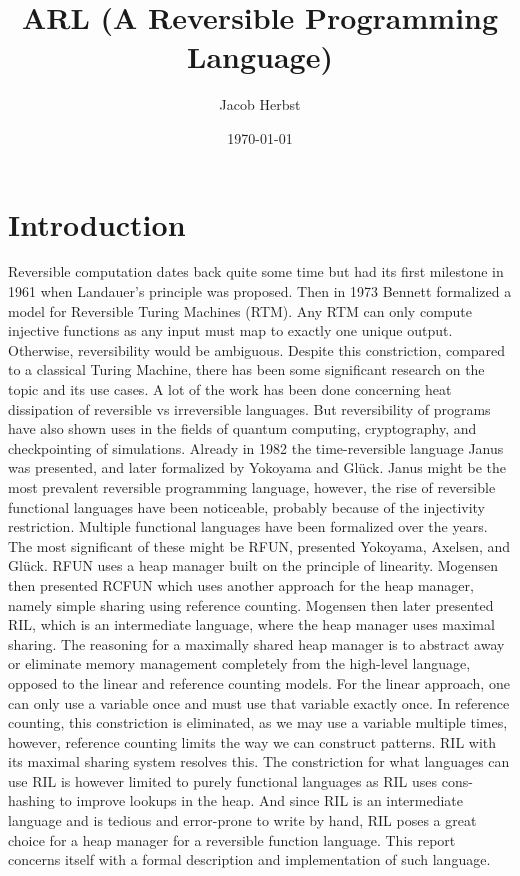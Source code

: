 \documentclass[a4paper]{article}
\author{Jacob Herbst}
\date{\today}
\title{ARL (A Reversible Programming Language)}
\begin{document}
\maketitle

\section{Introduction}
\label{intro}
Reversible computation dates back quite some time but had its first milestone in 1961 when Landauer's principle was proposed\cite{L61}. Then in 1973 Bennett\cite{B73} formalized a model for Reversible Turing Machines (RTM). Any RTM can only compute injective functions as any input must map to exactly one unique output. Otherwise, reversibility would be ambiguous. Despite this constriction, compared to a classical Turing Machine, there has been some significant research on the topic and its use cases. A lot of the work has been done concerning heat dissipation of reversible vs irreversible languages. But reversibility of programs have also shown uses in the fields of quantum computing, cryptography, and checkpointing of simulations\cite{Schordan2020}. Already in 1982 the time-reversible language Janus was presented, and later formalized by Yokoyama and Glück\cite{janus}. Janus might be the most prevalent reversible programming language, however, the rise of reversible functional languages have been noticeable, probably because of the injectivity restriction. Multiple functional languages have been formalized over the years. The most significant of these might be RFUN, presented Yokoyama, Axelsen, and Glück\cite{YokoyamaAxelsenGluck:2011}. RFUN uses a heap manager built on the principle of linearity. Mogensen then presented RCFUN\cite{Mogensen:RC2014} which uses another approach for the heap manager, namely simple sharing using reference counting. Mogensen then later presented RIL, which is an intermediate language, where the heap manager uses maximal sharing\cite{Mogensen2018ReversibleGC}. The reasoning for a maximally shared heap manager is to abstract away or eliminate memory management completely from the high-level language, opposed to the linear and reference counting models. For the linear approach, one can only use a variable once and must use that variable exactly once. In reference counting, this constriction is eliminated, as we may use a variable multiple times, however, reference counting limits the way we can construct patterns. RIL with its maximal sharing system resolves this. The constriction for what languages can use RIL is however limited to purely functional languages as RIL uses cons-hashing to improve lookups in the heap. And since RIL is an intermediate language and is tedious and error-prone to write by hand, RIL poses a great choice for a heap manager for a reversible function language. This report concerns itself with a formal description and implementation of such language.
\end{document}
